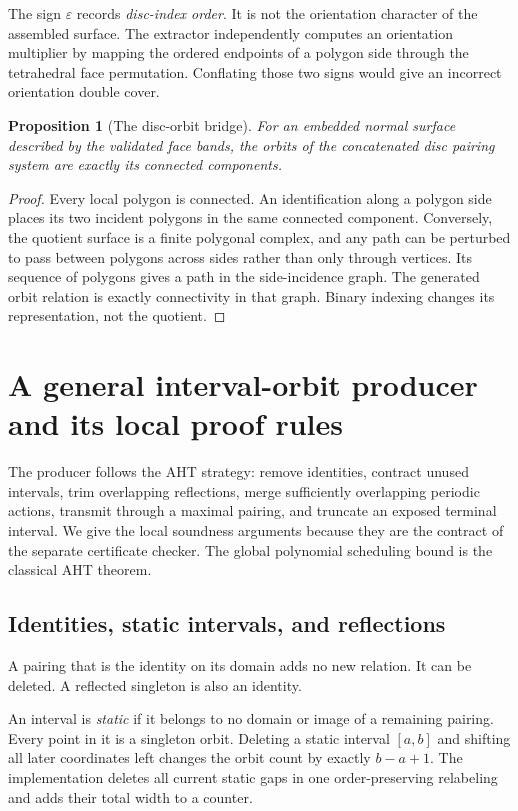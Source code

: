 \documentclass[11pt,a4paper]{article}
\newtheorem{proposition}[theorem]{Proposition}
\theoremstyle{definition}\newtheorem{definition}[theorem]{Definition}
\theoremstyle{remark}\newtheorem{remark}[theorem]{Remark}
\begin{document}
The sign $\varepsilon$ records \emph{disc-index order}. It is not the
orientation character of the assembled surface. The extractor independently
computes an orientation multiplier by mapping the ordered endpoints of a
polygon side through the tetrahedral face permutation. Conflating those two
signs would give an incorrect orientation double cover.

\begin{proposition}[The disc-orbit bridge]
For an embedded normal surface described by the validated face bands, the
orbits of the concatenated disc pairing system are exactly its connected
components.
\end{proposition}
\begin{proof}
Every local polygon is connected. An identification along a polygon side
places its two incident polygons in the same connected component. Conversely,
the quotient surface is a finite polygonal complex, and any path can be
perturbed to pass between polygons across sides rather than only through
vertices. Its sequence of polygons gives a path in the side-incidence graph.
The generated orbit relation is exactly connectivity in that graph. Binary
indexing changes its representation, not the quotient.
\end{proof}

\section{A general interval-orbit producer and its local proof rules}
\label{sec:aht}

The producer follows the AHT strategy: remove identities, contract unused
intervals, trim overlapping reflections, merge sufficiently overlapping
periodic actions, transmit through a maximal pairing, and truncate an exposed
terminal interval. We give the local soundness arguments because they are
the contract of the separate certificate checker. The global polynomial
scheduling bound is the classical AHT theorem.

\subsection{Identities, static intervals, and reflections}

A pairing that is the identity on its domain adds no new relation. It can be
deleted. A reflected singleton is also an identity.

An interval is \emph{static} if it belongs to no domain or image of a remaining
pairing. Every point in it is a singleton orbit. Deleting a static interval
$[a,b]$ and shifting all later coordinates left changes the orbit count by
exactly $b-a+1$. The implementation deletes all current static gaps in one
order-preserving relabeling and adds their total width to a counter.
\end{document}
